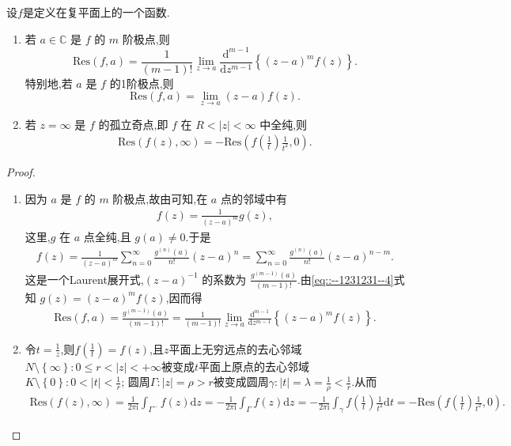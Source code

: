 \documentclass[../../main.tex]{subfiles}%
\begin{document}
\begin{proposition}\label{proposition:命题5.4.2}
设$f$是定义在复平面上的一个函数.
\begin{enumerate}[(1)]
\item 若 \( a\in \mathbb{C} \) 是 \( f \) 的 \( m \) 阶极点,则
\[
\mathrm{Res}(f,a) = \frac{1}{(m - 1)!} \lim_{z \to a} \frac{\mathrm{d}^{m - 1}}{\mathrm{d}z^{m - 1}} \left\{ (z - a)^m f(z) \right\}.
\]
特别地,若 \( a \) 是 \( f \) 的1阶极点,则
\[
\mathrm{Res}(f,a) = \lim_{z \to a} (z - a) f(z).
\]

\item 若 \( z = \infty \) 是 \( f \) 的孤立奇点,即 \( f \) 在 \( R < |z| < \infty \) 中全纯,则
\begin{align*}
\mathrm{Res}\left( f\left( z \right) ,\infty \right) =-\mathrm{Res}\left( f\left( \frac{1}{t} \right) \frac{1}{t^2},0 \right) .
\end{align*}
\end{enumerate}
\end{proposition}
\begin{proof}
\begin{enumerate}[(1)]
\item 因为 \( a \) 是 \( f \) 的 \( m \) 阶极点,故由可知,在 \( a \) 点的邻域中有
\begin{align}
f(z) = \frac{1}{(z - a)^m} g(z), 
\label{eq::--1231231--4}
\end{align}
这里,\( g \) 在 \( a \) 点全纯,且 \( g(a) \neq 0 \).于是
\begin{align*}
f(z) = \frac{1}{(z - a)^m} \sum_{n = 0}^{\infty} \frac{g^{(n)}(a)}{n!} (z - a)^n = \sum_{n = 0}^{\infty} \frac{g^{(n)}(a)}{n!} (z - a)^{n - m}.
\end{align*}
这是一个Laurent展开式,\( (z - a)^{-1} \) 的系数为 \( \frac{g^{(m - 1)}(a)}{(m - 1)!} \).由\eqref{eq::--1231231--4}式知 \( g(z) = (z - a)^m f(z) \),因而得
\begin{align*}
\mathrm{Res}(f,a) = \frac{g^{(m - 1)}(a)}{(m - 1)!} = \frac{1}{(m - 1)!} \lim_{z \to a} \frac{\mathrm{d}^{m - 1}}{\mathrm{d}z^{m - 1}} \left\{ (z - a)^m f(z) \right\}.
\end{align*}

\item 令$t=\frac{1}{z}$,则$f\left( \frac{1}{t} \right) =f\left( z \right)$,且$z$平面上无穷远点的去心邻域$N\setminus \left\{ \infty \right\} :0\leqslant r<\left| z \right|<+\infty$被变成$t$平面上原点的去心邻域$K\setminus \left\{ 0 \right\} :0<\left| t \right|<\frac{1}{r}$;
圆周$\Gamma :\left| z \right|=\rho >r$被变成圆周$\gamma :\left| t \right|=\lambda =\frac{1}{\rho}<\frac{1}{r}$.从而
\begin{align*}
\mathrm{Res}\left( f\left( z \right) ,\infty \right) =\frac{1}{2\pi \mathrm{i}}\int_{\Gamma ^-}{f\left( z \right) \mathrm{d}z}=-\frac{1}{2\pi \mathrm{i}}\int_{\Gamma}{f\left( z \right) \mathrm{d}z}
=-\frac{1}{2\pi \mathrm{i}}\int_{\gamma}{f\left( \frac{1}{t} \right) \frac{1}{t^2}\mathrm{d}t}=-\mathrm{Res}\left( f\left( \frac{1}{t} \right) \frac{1}{t^2},0 \right).
\end{align*}
\end{enumerate}

\end{proof}
\end{document}
